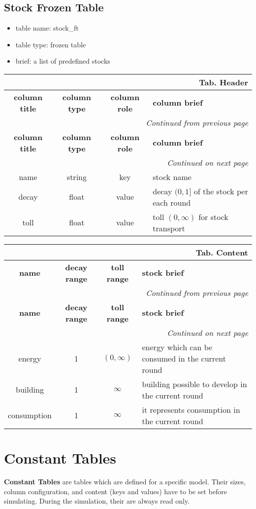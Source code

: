 \documentclass[a4paper,oneside,titlepage]{report}
\newcommand*{\LTHeaderIV}[5]{
  \multicolumn{4}{r}{\textbf{Tab. \thesubsection} \textbf{#1}}\\    
  \hline
  \textbf{#2} & \textbf{#3} & \textbf{#4} & \textbf{#5}\\
  \hline
  
  \endfirsthead
  \multicolumn{4}{r}{\textit{Continued from previous page}}\\    
  \hline
  \textbf{#2} & \textbf{#3} & \textbf{#4} & \textbf{#5}\\
  \hline
  \endhead
  \hline
  \multicolumn{4}{r}{\textit{Continued on next page}}\\
  \endfoot
  \hline
  \endlastfoot  
}
\begin{document}
\subsection{Stock Frozen Table}
\begin{itemize}
  \setlength{\itemsep}{0pt}
  \setlength{\parskip}{0pt}
\item table name: stock\_ft  
\item table type: frozen table   
\item brief: a list of predefined stocks
\end{itemize}
\label{stock_ft}

\vspace{-0.5cm}
\begin{longtable}{ |c|c|c|l| } 
  \LTHeaderIV{Header}{column title}{column type}{column role}{column brief}
  name & string & key & stock name\\
  decay & float & value & decay $(0, 1]$ of the stock per each round\\
  toll & float & value & toll $(0, \infty)$ for stock transport\\
\end{longtable}        

\vspace{-0.5cm}
\begin{longtable}{ |c|c|c|l| }    
  \LTHeaderIV{Content}{name}{decay range}{toll range}{stock brief}                    
  energy & 1 & $(0, \infty)$ & energy which can be consumed in the current round\\
  building & 1 & $\infty$ & building possible to develop in the current round\\
  consumption & 1 & $\infty$  & it represents consumption in the current round\\
\end{longtable}


\section{Constant Tables}
\textbf{Constant Tables} are tables which are defined for a specific model. Their sizes, column configuration, and content (keys and values) have to be set before simulating. During the simulation, their are always read only.

\end{document}
